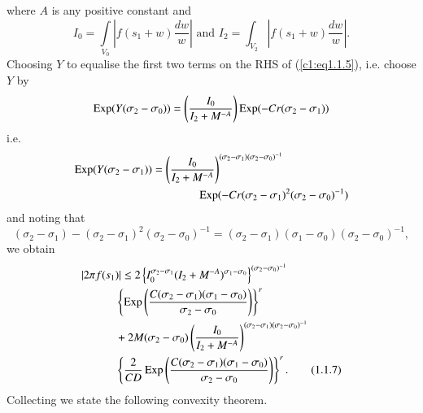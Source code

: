 where $A$ is any positive constant and
\begin{equation*}
I_0 = \int\limits_{V_0} |f(s_1 + w) \frac{dw}{w}| \text{ and } I_2 = \int_{V_2} |f(s_1 + w) \frac{dw}{w}|. \tag{1.1.6}\label{c1:eq1.1.6}
\end{equation*}
Choosing $Y$ to equalise the first two terms on the RHS of (\ref{c1:eq1.1.5}), i.e. choose $Y$ by 
$$
\operatorname{Exp} (Y (\sigma_2 - \sigma_0)) = \left(\frac{I_0}{I_2 + M^{-A}} \right) \operatorname{Exp} (-Cr (\sigma_2 - \sigma_1))
$$
i.e.
\begin{align*}
\operatorname{Exp} (Y (\sigma_2 - \sigma_1)) &= \left( \frac{I_0}{I_2 +
  M^{-A}}\right)^{(\sigma_2 - \sigma_1) (\sigma_2 - \sigma_0)^{-1}}\\
&\qquad\qquad\operatorname{Exp} (-Cr (\sigma_2 - \sigma_1)^2 (\sigma_2 - \sigma_0)^{-1})  
\end{align*}
and noting that
$$
(\sigma_2 - \sigma_1) - (\sigma_2 - \sigma_1)^2 (\sigma_2 - \sigma_0)^{-1} = (\sigma_2 - \sigma_1) (\sigma_1 - \sigma_0) (\sigma_2 - \sigma_0)^{-1},
$$
we obtain
\begin{align*}
& |2\pi f(s_1)| \leq 2 \left\{ I^{\sigma_2 - \sigma_1}_0 (I_2 +
  M^{-A})^{\sigma_1 - \sigma_0}\right\}^{(\sigma_2 -
    \sigma_0)^{-1}}\\  
&\qquad\quad\left\{ \operatorname{Exp} \left(\frac{C(\sigma_2 - \sigma_1) (\sigma_1 - \sigma_0)}{\sigma_2 - \sigma_0} \right) \right\}^r\\
&\qquad\quad {} + 2 M (\sigma_2 - \sigma_0) \left(\frac{I_0}{I_2 + M^{-A}}
  \right)^{(\sigma_2 - \sigma_1) (\sigma_2 - \sigma_0)^{-1}}\\ 
&\qquad\quad\left\{\frac{2}{CD} \operatorname{Exp} \left(\frac{C(\sigma_2 - \sigma_1) (\sigma_1
    - \sigma_0)}{\sigma_2 - \sigma_0} \right) \right\}^r. 
\tag{1.1.7} \label{c1:eq1.1.7} 
\end{align*}
Collecting we state the following convexity theorem.

